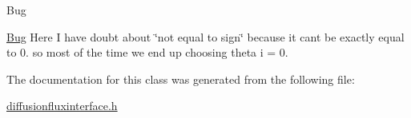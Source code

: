 \begin{DoxyRefDesc}{Bug}
\item[\hyperlink{bug__bug000004}{Bug}]Here I have doubt about \char`\"{}not equal to sign\char`\"{} because it can\textquotesingle{}t be exactly equal to 0. so most of the time we end up choosing theta i = 0. \end{DoxyRefDesc}


The documentation for this class was generated from the following file\+:\begin{DoxyCompactItemize}
\item 
\hyperlink{diffusionfluxinterface_8h}{diffusionfluxinterface.\+h}\end{DoxyCompactItemize}
